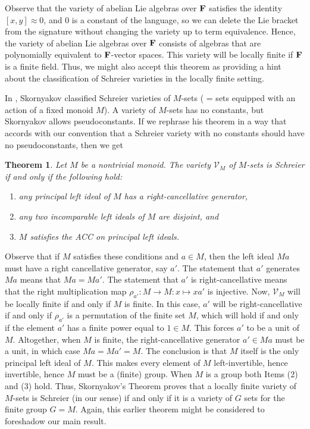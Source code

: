 \documentclass[12pt]{amsart}
\newtheorem{thm}{Theorem}[section] %
\theoremstyle{definition}
\numberwithin{equation}{section}
\newcommand{\m}[1]{{\mathbf{\uppercase{#1}}}}
\begin{document}
Observe that the variety of abelian Lie algebras over $\m f$
satisfies the identity $[x,y]\approx 0$, and $0$ is a constant
of the language, so we can delete the
Lie bracket from the signature
without changing the variety up to
term equivalence. Hence, the variety of abelian Lie
algebras over $\m f$
consists of algebras that are polynomially
equivalent to $\m f$-vector spaces.
This variety will be locally finite if
$\m f$ is a finite field.
Thus, we might also accept this theorem
as providing a hint about the classification of Schreier
varieties in the locally finite setting.
\bigskip

In \cite{skornyakov}, Skornyakov classified Schreier varieties of
$M$-sets ( = sets equipped with an action of a fixed monoid $M$).
A variety of $M$-sets has no constants,
but Skornyakov allows pseudoconstants.
If we rephrase his theorem in a way that accords
with our convention that a Schreier variety with
no constants should have no pseudoconstants, then we get

\begin{thm} \label{NM}
Let $M$ be a nontrivial monoid. The 
variety $\mathcal{V}_M$ of $M$-sets is Schreier
if and only if the following hold:
\begin{enumerate}
\item any principal left ideal of $M$ has a right-cancellative generator,
\item any two incomparable left ideals of $M$ are disjoint, and
\item $M$ satisfies the ACC on principal left ideals.
\end{enumerate}
\end{thm}

Observe that if $M$ satisfies these conditions
and $a\in M$, then the left ideal
$Ma$ must have a right cancellative generator, say $a'$.
The statement that $a'$ generates
$Ma$ means that $Ma=Ma'$. The statement that
$a'$ is right-cancellative means
that the right multiplication
map $\rho_{a'}\colon M\to M\colon x\mapsto xa'$
is injective. Now, $\mathcal{V}_M$ will be locally finite
if and only if $M$ is finite. In this case,
$a'$ will be right-cancellative if and only if
$\rho_{a'}$ is a permutation of the finite set $M$,
which will hold 
if and only if the element
$a'$ has a finite power equal to $1\in M$.
This forces $a'$ to be a unit of $M$. Altogether,
when $M$ is finite, the right-cancellative
generator $a'\in Ma$ must be a unit, in which case
$Ma=Ma' = M$.
The conclusion is that
$M$ itself is the only principal left ideal of $M$.
This makes every element of $M$ left-invertible, hence
invertible, hence $M$ must be a (finite) group. When $M$ is a group
both Items (2) and (3) hold.
Thus, 
Skornyakov's Theorem proves that a locally finite
variety of $M$-sets is Schreier (in our sense) if and only
if it is a variety of $G$ sets for the finite group $G=M$.
Again, this earlier theorem might be considered
to foreshadow our main result.
\end{document}
